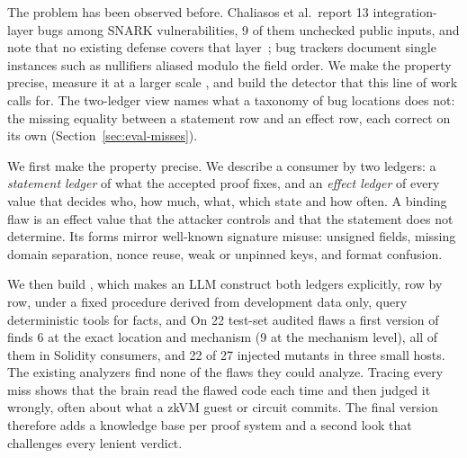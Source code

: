 The problem has been observed before. Chaliasos et al.\ report 13
integration-layer bugs among SNARK vulnerabilities, 9 of them unchecked public
inputs, and note that no existing defense covers that layer~\cite{sok-snark-bugs};
bug trackers document single instances such as nullifiers aliased modulo the
field order. We make the property precise, measure it at a larger scale
, and
build the detector that this line of work calls for. The two-ledger view
names what a taxonomy of bug locations does not: the missing equality between
a statement row and an effect row, each correct on its own
(Section~\ref{sec:eval-misses}).

We first make the property precise. We describe a consumer by two ledgers: a
\emph{statement ledger} of what the accepted proof fixes, and an \emph{effect
ledger} of every value that decides who, how much, what, which state and how
often. A binding flaw is an effect value that the attacker controls and that
the statement does not determine. Its forms mirror well-known signature
misuse: unsigned fields, missing domain separation, nonce reuse, weak or
unpinned keys, and format confusion.

We then build \tool{}, which makes an LLM construct both ledgers explicitly,
row by row, under a fixed procedure derived from development data only,
query deterministic tools for facts, and 
On 22 test-set audited flaws a first version of \tool{} finds 6 at the
exact location and mechanism (9 at the mechanism level), all of them in
Solidity consumers, and 22 of 27 injected mutants in three small hosts. The
existing analyzers find none of the flaws they could analyze. Tracing every miss shows that the brain read the flawed
code each time and then judged it wrongly, often about what a zkVM guest or
circuit commits. The final version therefore adds a knowledge base per proof
system and a second look that challenges every lenient verdict.

